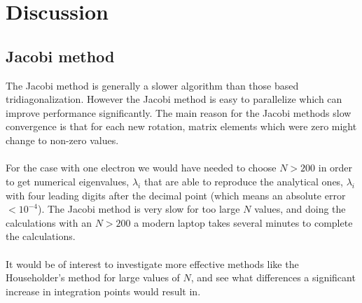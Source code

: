 \documentclass[a4paper, fontsize=11pt]{article}
\begin{document}
\section{Discussion}
\subsection{Jacobi method}
The Jacobi method is generally a slower algorithm than those based tridiagonalization. However the Jacobi method is easy to parallelize which can improve performance significantly. The main reason for the Jacobi methods slow convergence is that for each new rotation, matrix elements which were zero might change to non-zero values.


\paragraph{}
For the case with one electron we would have needed to choose $N > 200$ in order to get numerical eigenvalues, $\hat{\lambda}_i$ that are able to reproduce the analytical ones, $\lambda_i$ with four leading digits after the decimal point (which means an absolute error $< 10^{-4}$). The Jacobi method is very slow for too large $N$ values, and doing the calculations with an $N > 200$ a modern laptop takes several minutes to complete the calculations. 

\paragraph{}
It would be of interest to investigate more effective methods like the Householder's method for large values of $N$, and see what differences a significant increase in integration points would result in.



\end{document}
